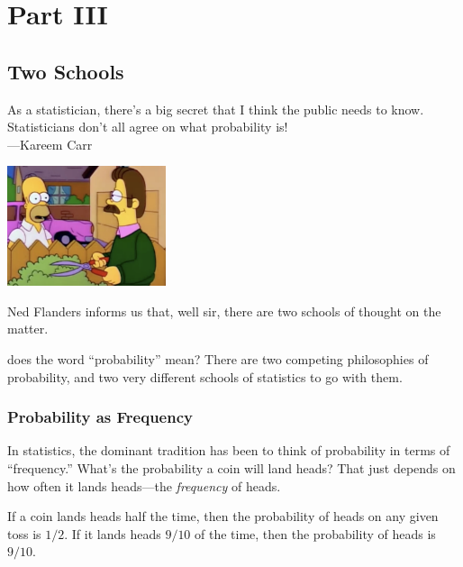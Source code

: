 \documentclass[justified]{tufte-book}
\newenvironment{epigraph}%
{
\begin{flushright}    
\begin{minipage}{20em}
\begin{flushright}
\itshape
}%
{
\end{flushright}
\end{minipage}
\end{flushright}
}
\theoremstyle{definition}
\theoremstyle{definition}
\theoremstyle{definition}
\theoremstyle{definition}
\theoremstyle{remark}
\begin{document}
\hypertarget{part-part-iii}{%
\part*{Part III}\label{part-part-iii}}

\hypertarget{two-schools}{%
\chapter{Two Schools}\label{two-schools}}

\begin{epigraph}
As a statistician, there's a big secret that I think the public needs to
know. Statisticians don't all agree on what probability is!\\
---Kareem Carr
\end{epigraph}

\begin{marginfigure}
\includegraphics[width=1.83in]{img/flanders} \caption[Ned Flanders informs us that, well sir, there are two schools of thought on the matter]{Ned Flanders informs us that, well sir, there are two schools of thought on the matter.}\label{fig:unnamed-chunk-119}
\end{marginfigure}

 does the word ``probability'' mean? There are two competing philosophies of probability, and two very different schools of statistics to go with them.

\hypertarget{probability-as-frequency}{%
\section{Probability as Frequency}\label{probability-as-frequency}}

In statistics, the dominant tradition has been to think of probability in terms of ``frequency.'' What's the probability a coin will land heads? That just depends on how often it lands heads---the \emph{frequency} of heads.

If a coin lands heads half the time, then the probability of heads on any given toss is \(1/2\). If it lands heads \(9/10\) of the time, then the probability of heads is \(9/10\).
\end{document}

